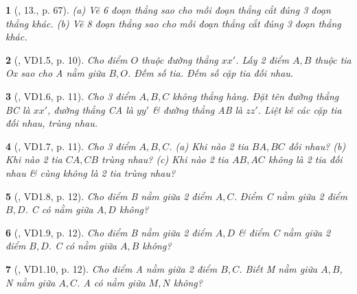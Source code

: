 \documentclass{article}
\newtheorem{baitoan}{}
\begin{document}
\begin{baitoan}[\cite{Binh_Toan_6_tap_2}, 13., p. 67]
	(a) Vẽ 6 đoạn thẳng sao cho mỗi đoạn thẳng cắt đúng 3 đoạn thẳng khác. (b) Vẽ 8 đoạn thẳng sao cho mỗi đoạn thẳng cắt đúng 3 đoạn thẳng khác.
\end{baitoan}

\begin{baitoan}[\cite{TLCT_THCS_Toan_6_hinh_hoc}, VD1.5, p. 10]
	Cho điểm $O$ thuộc đường thẳng $xx'$. Lấy 2 điểm $A,B$ thuộc tia Ox sao cho A nằm giữa $B,O$. Đếm số tia. Đếm số cặp tia đối nhau.
\end{baitoan}

\begin{baitoan}[\cite{TLCT_THCS_Toan_6_hinh_hoc}, VD1.6, p. 11]
	Cho 3 điểm $A,B,C$ không thẳng hàng. Đặt tên đường thẳng BC là $xx'$, đường thẳng CA là $yy'$ \& đường thẳng AB là $zz'$. Liệt kê các cặp tia đối nhau, trùng nhau.
\end{baitoan}

\begin{baitoan}[\cite{TLCT_THCS_Toan_6_hinh_hoc}, VD1.7, p. 11]
	Cho 3 điểm $A,B,C$. (a) Khi nào 2 tia $BA,BC$ đối nhau? (b) Khi nào 2 tia $CA,CB$ trùng nhau? (c) Khi nào 2 tia $AB,AC$ không là 2 tia đối nhau \& cùng không là 2 tia trùng nhau?
\end{baitoan}

\begin{baitoan}[\cite{TLCT_THCS_Toan_6_hinh_hoc}, VD1.8, p. 12]
	Cho điểm B nằm giữa 2 điểm $A,C$. Điểm C nằm giữa 2 điểm $B,D$. C có nằm giữa $A,D$ không?
\end{baitoan}

\begin{baitoan}[\cite{TLCT_THCS_Toan_6_hinh_hoc}, VD1.9, p. 12]
	Cho điểm B nằm giữa 2 điểm $A,D$ \& điểm C nằm giữa 2 điểm $B,D$. C có nằm giữa $A,B$ không?
\end{baitoan}

\begin{baitoan}[\cite{TLCT_THCS_Toan_6_hinh_hoc}, VD1.10, p. 12]
	Cho điểm A nằm giữa 2 điểm $B,C$. Biết M nằm giữa $A,B$, N nằm giữa $A,C$. A có nằm giữa $M,N$ không?
\end{baitoan}
\end{document}
